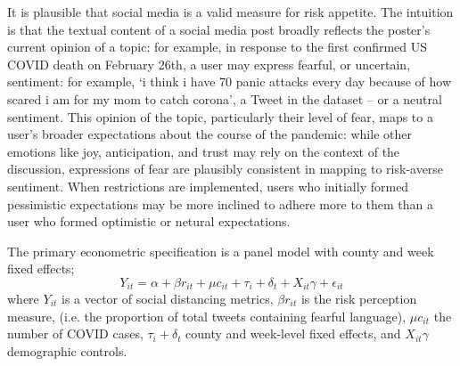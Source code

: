 \documentclass{article}
\begin{document}
It is plausible that social media is a valid measure for risk appetite. The intuition is that the textual content of a social media post broadly reflects the poster's current opinion of a topic: for example, in response to the first confirmed US COVID death on February 26th, a user may express fearful, or uncertain, sentiment: for example, `i think i have 70 panic attacks every day because of how scared i am for my mom to catch corona', a Tweet in the dataset -- or a neutral sentiment. This opinion of the topic, particularly their level of fear, maps to a user's broader expectations about the course of the pandemic: while other emotions like joy, anticipation, and trust may rely on the context of the discussion, expressions of fear are plausibly consistent in mapping to risk-averse sentiment. When restrictions are implemented, users who initially formed pessimistic expectations may be more inclined to adhere more to them than a user who formed optimistic or netural expectations. 

The primary econometric specification is a panel model with county and week fixed effects;
\[Y_{it} = \alpha + \beta r_{it} + \mu c_{it} + \tau_i + \delta_t +  X_{it}\gamma + \epsilon_{it}\]
where \(Y_{it}\) is a vector of social distancing metrics, \(\beta r_{it}\) is the risk perception measure, (i.e. the proportion of total tweets containing fearful language), \(\mu c_{it}\) the number of COVID cases, \(\tau_i + \delta_t\) county and week-level fixed effects, and \(X_{it}\gamma\) demographic controls.
\end{document}
